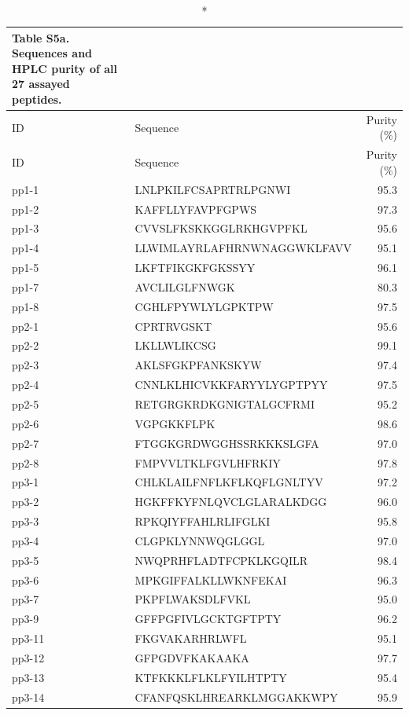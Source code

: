 \begingroup\small\setlength{\tabcolsep}{4pt}\renewcommand{\arraystretch}{1.15}
\begin{longtable}{l>{\raggedright\arraybackslash}p{.65\linewidth}r}
\caption*{\textbf{Table S5a.} Sequences and HPLC purity of all 27 assayed peptides.}\\
\toprule
ID & Sequence & Purity (\%) \\
\midrule\endfirsthead
ID & Sequence & Purity (\%) \\
\midrule\endhead
pp1-1 & LNLPKILFCSAPRTRLPGNWI & 95.3 \\
pp1-2 & KAFFLLYFAVPFGPWS & 97.3 \\
pp1-3 & CVVSLFKSKKGGLRKHGVPFKL & 95.6 \\
pp1-4 & LLWIMLAYRLAFHRNWNAGGWKLFAVV & 95.1 \\
pp1-5 & LKFTFIKGKFGKSSYY & 96.1 \\
pp1-7 & AVCLILGLFNWGK & 80.3 \\
pp1-8 & CGHLFPYWLYLGPKTPW & 97.5 \\
pp2-1 & CPRTRVGSKT & 95.6 \\
pp2-2 & LKLLWLIKCSG & 99.1 \\
pp2-3 & AKLSFGKPFANKSKYW & 97.4 \\
pp2-4 & CNNLKLHICVKKFARYYLYGPTPYY & 97.5 \\
pp2-5 & RETGRGKRDKGNIGTALGCFRMI & 95.2 \\
pp2-6 & VGPGKKFLPK & 98.6 \\
pp2-7 & FTGGKGRDWGGHSSRKKKSLGFA & 97.0 \\
pp2-8 & FMPVVLTKLFGVLHFRKIY & 97.8 \\
pp3-1 & CHLKLAILFNFLKFLKQFLGNLTYV & 97.2 \\
pp3-2 & HGKFFKYFNLQVCLGLARALKDGG & 96.0 \\
pp3-3 & RPKQIYFFAHLRLIFGLKI & 95.8 \\
pp3-4 & CLGPKLYNNWQGLGGL & 97.0 \\
pp3-5 & NWQPRHFLADTFCPKLKGQILR & 98.4 \\
pp3-6 & MPKGIFFALKLLWKNFEKAI & 96.3 \\
pp3-7 & PKPFLWAKSDLFVKL & 95.0 \\
pp3-9 & GFFPGFIVLGCKTGFTPTY & 96.2 \\
pp3-11 & FKGVAKARHRLWFL & 95.1 \\
pp3-12 & GFPGDVFKAKAAKA & 97.7 \\
pp3-13 & KTFKKKLFLKLFYILHTPTY & 95.4 \\
pp3-14 & CFANFQSKLHREARKLMGGAKKWPY & 95.9 \\
\bottomrule\end{longtable}\endgroup
